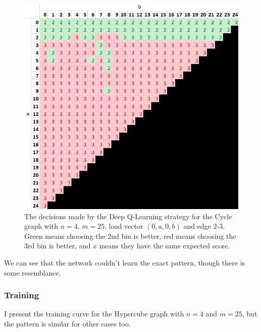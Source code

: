 \begin{figure}[h!] \label{greedy-counterexample-analysed-for-dqn}
    \centering
    \includegraphics[scale=1.0]{Chapter4/Figs/0a0b_4_25_analysis_dqn.png}
    \caption{The decisions made by the Deep Q-Learning strategy for the Cycle graph with $n=4$, $m=25$, load vector $(0,a,0,b)$ and edge $2$-$3$. Green means choosing the $2$nd bin is better, red means choosing the $3$rd bin is better, and $x$ means they have the same expected score.}
\end{figure}


We can see that the network couldn't learn the exact pattern, though there is some resemblance.


\subsubsection{Training}

I present the training curve for the Hypercube graph with $n=4$ and $m=25$, but the pattern is similar for other cases too.


